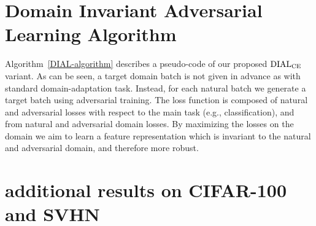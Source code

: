 \newpage
\section{Domain Invariant Adversarial Learning Algorithm}
\label{algo-appendix}
Algorithm~\ref{DIAL-algorithm} describes a pseudo-code of our proposed $\operatorname{DIAL}_{\operatorname{CE}}$ variant. As can be seen, a target domain batch is not given in advance as with standard domain-adaptation task. Instead, for each natural batch we generate a target batch using adversarial training. The loss function is composed of natural and adversarial losses with respect to the main task (e.g., classification), and from natural and adversarial domain losses. By maximizing the losses on the domain we aim to learn a feature representation which is invariant to the natural and adversarial domain, and therefore more robust.



\section{additional results on CIFAR-100 and SVHN}
\label{cifar100-svhn-appendix}

